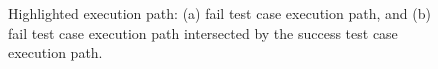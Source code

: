 \begin{figure}[!ht]
\begin{center}
\caption{Highlighted execution path: (a) fail test case execution
path, and (b) fail test case execution path intersected by the
success test case execution path.}\label{fig:slice-source}
\end{center}
\end{figure}
